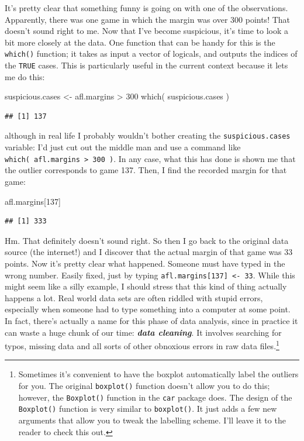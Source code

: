 \documentclass[
]{book}
\newenvironment{Shaded}{\begin{snugshade}}{\end{snugshade}}
\newcommand{\DecValTok}[1]{\textcolor[rgb]{0.00,0.00,0.81}{#1}}
\newcommand{\FunctionTok}[1]{\textcolor[rgb]{0.00,0.00,0.00}{#1}}
\newcommand{\NormalTok}[1]{#1}
\newcommand{\OtherTok}[1]{\textcolor[rgb]{0.56,0.35,0.01}{#1}}
\newcommand{\SpecialCharTok}[1]{\textcolor[rgb]{0.00,0.00,0.00}{#1}}
\begin{document}
It's pretty clear that something funny is going on with one of the observations. Apparently, there was one game in which the margin was over 300 points! That doesn't sound right to me. Now that I've become suspicious, it's time to look a bit more closely at the data. One function that can be handy for this is the \texttt{which()} function; it takes as input a vector of logicals, and outputs the indices of the \texttt{TRUE} cases. This is particularly useful in the current context because it lets me do this:

\begin{Shaded}
\begin{Highlighting}[]
\NormalTok{suspicious.cases }\OtherTok{\textless{}{-}}\NormalTok{ afl.margins }\SpecialCharTok{\textgreater{}} \DecValTok{300}
\FunctionTok{which}\NormalTok{( suspicious.cases )}
\end{Highlighting}
\end{Shaded}

\begin{verbatim}
## [1] 137
\end{verbatim}

although in real life I probably wouldn't bother creating the \texttt{suspicious.cases} variable: I'd just cut out the middle man and use a command like \texttt{which(\ afl.margins\ \textgreater{}\ 300\ )}. In any case, what this has done is shown me that the outlier corresponds to game 137. Then, I find the recorded margin for that game:

\begin{Shaded}
\begin{Highlighting}[]
\NormalTok{afl.margins[}\DecValTok{137}\NormalTok{]}
\end{Highlighting}
\end{Shaded}

\begin{verbatim}
## [1] 333
\end{verbatim}

Hm. That definitely doesn't sound right. So then I go back to the original data source (the internet!) and I discover that the actual margin of that game was 33 points. Now it's pretty clear what happened. Someone must have typed in the wrong number. Easily fixed, just by typing \texttt{afl.margins{[}137{]}\ \textless{}-\ 33}. While this might seem like a silly example, I should stress that this kind of thing actually happens a lot. Real world data sets are often riddled with stupid errors, especially when someone had to type something into a computer at some point. In fact, there's actually a name for this phase of data analysis, since in practice it can waste a huge chunk of our time: \textbf{\emph{data cleaning}}. It involves searching for typos, missing data and all sorts of other obnoxious errors in raw data files.\footnote{Sometimes it's convenient to have the boxplot automatically label the outliers for you. The original \texttt{boxplot()} function doesn't allow you to do this; however, the \texttt{Boxplot()} function in the \texttt{car} package does. The design of the \texttt{Boxplot()} function is very similar to \texttt{boxplot()}. It just adds a few new arguments that allow you to tweak the labelling scheme. I'll leave it to the reader to check this out.}
\end{document}
